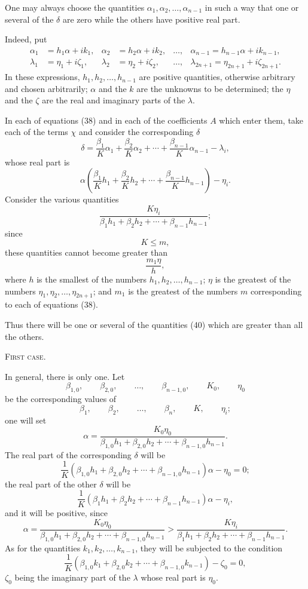 \documentclass[11pt]{article}
\begin{document}
One may always choose the quantities $\alpha_1,\alpha_2,\ldots,\alpha_{n-1}$ in such a way that one or several of the $\delta$ are zero while the others have positive real part.

Indeed, put
\[
\begin{aligned}
\alpha_1&=h_1\alpha+ik_1,& \alpha_2&=h_2\alpha+ik_2,& \ldots,& \alpha_{n-1}=h_{n-1}\alpha+ik_{n-1},\\
\lambda_1&=\eta_1+i\zeta_1,& \lambda_2&=\eta_2+i\zeta_2,& \ldots,& \lambda_{2n+1}=\eta_{2n+1}+i\zeta_{2n+1}.
\end{aligned}
\]
In these expressions, $h_1,h_2,\ldots,h_{n-1}$ are positive quantities, otherwise arbitrary and chosen arbitrarily; $\alpha$ and the $k$ are the unknowns to be determined; the $\eta$ and the $\zeta$ are the real and imaginary parts of the $\lambda$.

In each of equations (38) and in each of the coefficients $A$ which enter them, take each of the terms $\chi$ and consider the corresponding $\delta$
\[
\delta=\frac{\beta_1}{K}\alpha_1+\frac{\beta_2}{K}\alpha_2+\cdots+\frac{\beta_{n-1}}{K}\alpha_{n-1}-\lambda_i,
\]
whose real part is
\[
\alpha\left(\frac{\beta_1}{K}h_1+\frac{\beta_2}{K}h_2+\cdots+\frac{\beta_{n-1}}{K}h_{n-1}\right)-\eta_i.
\]
Consider the various quantities
\begin{equation*}\tag{40}
\frac{K\eta_i}{\beta_1h_1+\beta_2h_2+\cdots+\beta_{n-1}h_{n-1}};
\end{equation*}
since
\[
K\leq m,
\]
these quantities cannot become greater than
\[
\frac{m_1\eta}{h},
\]
where $h$ is the smallest of the numbers $h_1,h_2,\ldots,h_{n-1}$; $\eta$ is the greatest of the numbers $\eta_1,\eta_2,\ldots,\eta_{2n+1}$; and $m_1$ is the greatest of the numbers $m$ corresponding to each of equations (38).

Thus there will be one or several of the quantities (40) which are greater than all the others.

\begin{center}
{\scshape First case.}
\end{center}

In general, there is only one. Let
\[
\beta_{1,0},\qquad \beta_{2,0},\qquad \ldots,\qquad \beta_{n-1,0},\qquad K_0,\qquad \eta_0
\]
be the corresponding values of
\[
\beta_1,\qquad \beta_2,\qquad \ldots,\qquad \beta_n,\qquad K,\qquad \eta_i;
\]
one will set
\[
\alpha=\frac{K_0\eta_0}{\beta_{1,0}h_1+\beta_{2,0}h_2+\cdots+\beta_{n-1,0}h_{n-1}}.
\]
The real part of the corresponding $\delta$ will be
\[
\frac1K(\beta_{1,0}h_1+\beta_{2,0}h_2+\cdots+\beta_{n-1,0}h_{n-1})\alpha-\eta_0=0;
\]
the real part of the other $\delta$ will be
\begin{equation*}\tag{41}
\frac1K(\beta_1h_1+\beta_2h_2+\cdots+\beta_{n-1}h_{n-1})\alpha-\eta_i,
\end{equation*}
and it will be positive, since
\[
\alpha=\frac{K_0\eta_0}{\beta_{1,0}h_1+\beta_{2,0}h_2+\cdots+\beta_{n-1,0}h_{n-1}}
>
\frac{K\eta_i}{\beta_1h_1+\beta_2h_2+\cdots+\beta_{n-1}h_{n-1}}.
\]
As for the quantities $k_1,k_2,\ldots,k_{n-1}$, they will be subjected to the condition
\[
\frac1K(\beta_{1,0}k_1+\beta_{2,0}k_2+\cdots+\beta_{n-1,0}k_{n-1})-\zeta_0=0,
\]
$\zeta_0$ being the imaginary part of the $\lambda$ whose real part is $\eta_0$.
\end{document}
